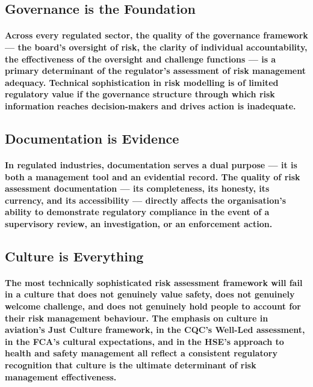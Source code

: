\subsection{Governance is the Foundation}
\paragraph{Across every regulated sector, the quality of the \textbf{governance framework} — the board's oversight of risk, the clarity of individual accountability, the effectiveness of the oversight and challenge functions — is a primary determinant of the regulator's assessment of risk management adequacy. Technical sophistication in risk modelling is of limited regulatory value if the governance structure through which risk information reaches decision-makers and drives action is inadequate.}

\subsection{Documentation is Evidence}
\paragraph{In regulated industries, \textbf{documentation} serves a dual purpose — it is both a management tool and an evidential record. The quality of risk assessment documentation — its completeness, its honesty, its currency, and its accessibility — directly affects the organisation's ability to demonstrate regulatory compliance in the event of a supervisory review, an investigation, or an enforcement action.}

\subsection{Culture is Everything}
\paragraph{The most technically sophisticated risk assessment framework will fail in a culture that does not genuinely value safety, does not genuinely welcome challenge, and does not genuinely hold people to account for their risk management behaviour. The emphasis on culture in aviation's Just Culture framework, in the CQC's Well-Led assessment, in the FCA's cultural expectations, and in the HSE's approach to health and safety management all reflect a consistent regulatory recognition that culture is the ultimate determinant of risk management effectiveness.}

